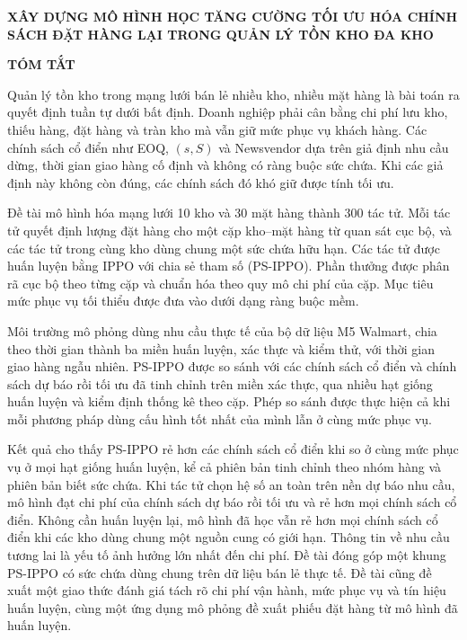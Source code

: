 \newpage
\begin{center}
{\fontsize{15pt}{18pt}\selectfont \textbf{XÂY DỰNG MÔ HÌNH HỌC TĂNG CƯỜNG TỐI ƯU HÓA CHÍNH SÁCH ĐẶT HÀNG LẠI TRONG QUẢN LÝ TỒN KHO ĐA KHO}\par}
\vspace{0.5cm}
{\fontsize{16pt}{19.2pt}\selectfont \textbf{TÓM TẮT}\par}
\end{center}
\vspace{0.2cm}

Quản lý tồn kho trong mạng lưới bán lẻ nhiều kho, nhiều mặt hàng là bài toán ra quyết định tuần tự dưới bất định. Doanh nghiệp phải cân bằng chi phí lưu kho, thiếu hàng, đặt hàng và tràn kho mà vẫn giữ mức phục vụ khách hàng. Các chính sách cổ điển như EOQ, $(s, S)$ và Newsvendor dựa trên giả định nhu cầu dừng, thời gian giao hàng cố định và không có ràng buộc sức chứa. Khi các giả định này không còn đúng, các chính sách đó khó giữ được tính tối ưu.

Đề tài mô hình hóa mạng lưới 10 kho và 30 mặt hàng thành 300 tác tử. Mỗi tác tử quyết định lượng đặt hàng cho một cặp kho--mặt hàng từ quan sát cục bộ, và các tác tử trong cùng kho dùng chung một sức chứa hữu hạn. Các tác tử được huấn luyện bằng IPPO với chia sẻ tham số (PS-IPPO). Phần thưởng được phân rã cục bộ theo từng cặp và chuẩn hóa theo quy mô chi phí của cặp. Mục tiêu mức phục vụ tối thiểu được đưa vào dưới dạng ràng buộc mềm.

Môi trường mô phỏng dùng nhu cầu thực tế của bộ dữ liệu M5 Walmart, chia theo thời gian thành ba miền huấn luyện, xác thực và kiểm thử, với thời gian giao hàng ngẫu nhiên. PS-IPPO được so sánh với các chính sách cổ điển và chính sách dự báo rồi tối ưu đã tinh chỉnh trên miền xác thực, qua nhiều hạt giống huấn luyện và kiểm định thống kê theo cặp. Phép so sánh được thực hiện cả khi mỗi phương pháp dùng cấu hình tốt nhất của mình lẫn ở cùng mức phục vụ.

Kết quả cho thấy PS-IPPO rẻ hơn các chính sách cổ điển khi so ở cùng mức phục vụ ở mọi hạt giống huấn luyện, kể cả phiên bản tinh chỉnh theo nhóm hàng và phiên bản biết sức chứa. Khi tác tử chọn hệ số an toàn trên nền dự báo nhu cầu, mô hình đạt chi phí của chính sách dự báo rồi tối ưu và rẻ hơn mọi chính sách cổ điển. Không cần huấn luyện lại, mô hình đã học vẫn rẻ hơn mọi chính sách cổ điển khi các kho dùng chung một nguồn cung có giới hạn. Thông tin về nhu cầu tương lai là yếu tố ảnh hưởng lớn nhất đến chi phí. Đề tài đóng góp một khung PS-IPPO có sức chứa dùng chung trên dữ liệu bán lẻ thực tế. Đề tài cũng đề xuất một giao thức đánh giá tách rõ chi phí vận hành, mức phục vụ và tín hiệu huấn luyện, cùng một ứng dụng mô phỏng đề xuất phiếu đặt hàng từ mô hình đã huấn luyện.
